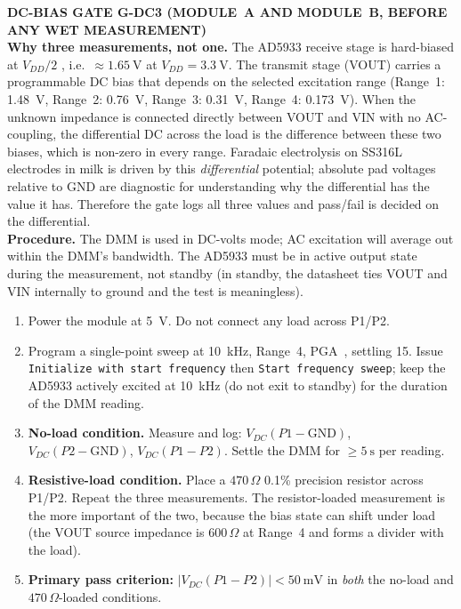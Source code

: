 \documentclass[11pt,a4paper]{article}
\newcommand{\Rohm}[1]{\ensuremath{#1\,\Omega}}
\begin{document}
\begin{gatebox}
\textbf{DC-BIAS GATE G-DC3 (MODULE~A AND MODULE~B, BEFORE ANY WET MEASUREMENT)}
\\[2pt]
\textbf{Why three measurements, not one.} The AD5933 receive stage is hard-biased at $V_{DD}/2$ \cite{ad5933ds}, i.e.\ $\approx\SI{1.65}{\volt}$ at $V_{DD}=\SI{3.3}{\volt}$. The transmit stage (VOUT) carries a programmable DC bias that depends on the selected excitation range (Range~1: \SI{1.48}{\volt}, Range~2: \SI{0.76}{\volt}, Range~3: \SI{0.31}{\volt}, Range~4: \SI{0.173}{\volt}). When the unknown impedance is connected directly between VOUT and VIN with no AC-coupling, the differential DC across the load is the difference between these two biases, which is non-zero in every range. Faradaic electrolysis on SS316L electrodes in milk is driven by this \emph{differential} potential; absolute pad voltages relative to GND are diagnostic for understanding why the differential has the value it has. Therefore the gate logs all three values and pass/fail is decided on the differential.
\\[2pt]
\textbf{Procedure.} The DMM is used in DC-volts mode; AC excitation will average out within the DMM's bandwidth. The AD5933 must be in active output state during the measurement, not standby (in standby, the datasheet \cite{ad5933ds} ties VOUT and VIN internally to ground and the test is meaningless).
\begin{enumerate}
\item Power the module at \SI{5}{\volt}. Do not connect any load across P1/P2.
\item Program a single-point sweep at \SI{10}{\kilo\hertz}, Range~4, PGA~, settling 15. Issue \texttt{Initialize with start frequency} then \texttt{Start frequency sweep}; keep the AD5933 actively excited at \SI{10}{\kilo\hertz} (do not exit to standby) for the duration of the DMM reading.
\item \textbf{No-load condition.} Measure and log: $V_{DC}(P1\!-\!\mathrm{GND})$, $V_{DC}(P2\!-\!\mathrm{GND})$, $V_{DC}(P1\!-\!P2)$. Settle the DMM for $\geq\SI{5}{\second}$ per reading.
\item \textbf{Resistive-load condition.} Place a \Rohm{470} 0.1\% precision resistor across P1/P2. Repeat the three measurements. The resistor-loaded measurement is the more important of the two, because the bias state can shift under load (the VOUT source impedance is \Rohm{600} at Range~4 and forms a divider with the load).
\item \textbf{Primary pass criterion:} $|V_{DC}(P1\!-\!P2)| < \SI{50}{\milli\volt}$ in \emph{both} the no-load and \Rohm{470}-loaded conditions.

\end{enumerate}
\end{gatebox}
\end{document}
